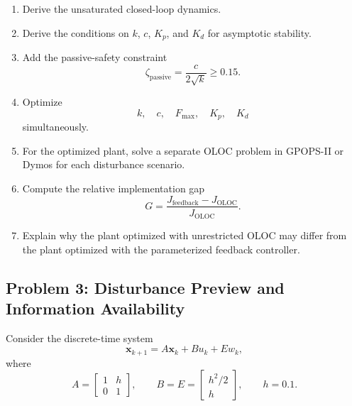 \begin{enumerate}
    \item Derive the unsaturated closed-loop dynamics.

    \item Derive the conditions on $k$, $c$, $K_p$, and $K_d$ for
    asymptotic stability.

    \item Add the passive-safety constraint
    \begin{equation}
    \zeta_{\mathrm{passive}}
    =
    \frac{c}{2\sqrt{k}}
    \geq 0.15.
    \end{equation}

    \item Optimize
    \begin{equation}
    k,\quad c,\quad F_{\max},\quad K_p,\quad K_d
    \end{equation}
    simultaneously.

    \item For the optimized plant, solve a separate OLOC problem in
    GPOPS-II or Dymos for each disturbance scenario.

    \item Compute the relative implementation gap
    \begin{equation}
    G=
    \frac{J_{\mathrm{feedback}}-J_{\mathrm{OLOC}}}
    {J_{\mathrm{OLOC}}}.
    \end{equation}

    \item Explain why the plant optimized with unrestricted OLOC may differ
    from the plant optimized with the parameterized feedback controller.
\end{enumerate}


\subsection*{Problem 3: Disturbance Preview and Information Availability}

Consider the discrete-time system
\begin{equation}
\mathbf{x}_{k+1}
=
A\mathbf{x}_k
+
Bu_k
+
Ew_k,
\end{equation}
where
\begin{equation}
A=
\begin{bmatrix}
1 & h\\
0 & 1
\end{bmatrix},
\qquad
B=E=
\begin{bmatrix}
h^2/2\\
h
\end{bmatrix},
\qquad
h=0.1.
\end{equation}


